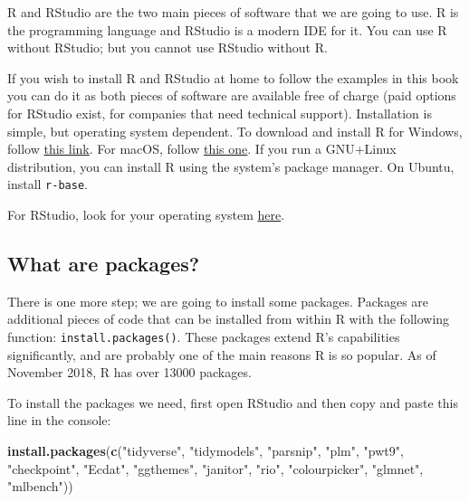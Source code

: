 \documentclass[]{gitbook}
\newenvironment{Shaded}{\begin{snugshade}}{\end{snugshade}}
\newcommand{\KeywordTok}[1]{\textcolor[rgb]{0.13,0.29,0.53}{\textbf{#1}}}
\newcommand{\NormalTok}[1]{#1}
\newcommand{\StringTok}[1]{\textcolor[rgb]{0.31,0.60,0.02}{#1}}
\begin{document}
R and RStudio are the two main pieces of software that we are going to use. R is the programming
language and RStudio is a modern IDE for it. You can use R without RStudio; but you cannot use
RStudio without R.

If you wish to install R and RStudio at home to follow the examples in this book you can do it as
both pieces of software are available free of charge (paid options for RStudio exist, for companies
that need technical support). Installation is simple, but operating system dependent. To download
and install R for Windows, follow \href{https://cloud.r-project.org/bin/windows/base/}{this link}.
For macOS, follow \href{https://cloud.r-project.org/bin/macosx/}{this one}. If you run a GNU+Linux
distribution, you can install R using the system's package manager. On Ubuntu, install \texttt{r-base}.

For RStudio, look for your operating system \href{https://www.rstudio.com/products/rstudio/download/\#download}{here}.

\hypertarget{what-are-packages}{%
\subsection*{What are packages?}\label{what-are-packages}}

There is one more step; we are going to install some packages. Packages are additional pieces of
code that can be installed from within R with the following function: \texttt{install.packages()}. These
packages extend R's capabilities significantly, and are probably one of the main reasons R is so
popular. As of November 2018, R has over 13000 packages.

To install the packages we need, first open RStudio and then copy and paste this line in the console:

\begin{Shaded}
\begin{Highlighting}[]
\KeywordTok{install.packages}\NormalTok{(}\KeywordTok{c}\NormalTok{(}\StringTok{"tidyverse"}\NormalTok{, }\StringTok{"tidymodels"}\NormalTok{, }\StringTok{"parsnip"}\NormalTok{, }\StringTok{"plm"}\NormalTok{, }\StringTok{"pwt9"}\NormalTok{, }\StringTok{"checkpoint"}\NormalTok{, }\StringTok{"Ecdat"}\NormalTok{,}
                \StringTok{"ggthemes"}\NormalTok{, }\StringTok{"janitor"}\NormalTok{, }\StringTok{"rio"}\NormalTok{, }\StringTok{"colourpicker"}\NormalTok{, }\StringTok{"glmnet"}\NormalTok{, }\StringTok{"mlbench"}\NormalTok{))}
\end{Highlighting}
\end{Shaded}
\end{document}
